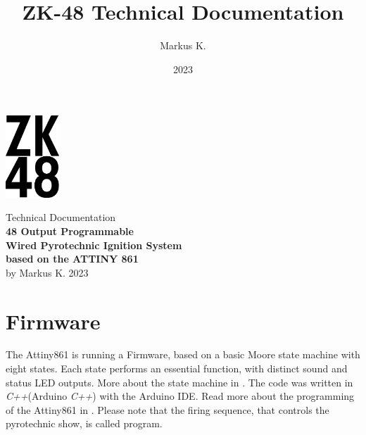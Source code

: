 

\title{ZK-48 Technical Documentation}
\author{Markus K.}
\date{2023}

%



\begin{titlepage}
\begin{center}
\vspace*{1cm}
\includegraphics[width=2cm]{./Figures/zk_48_logo.png}
\vspace*{1cm}

\Huge {Technical Documentation\\} 
\vspace*{1cm}
\Huge{\textbf{48 Output Programmable\\ Wired Pyrotechnic Ignition System\\ based on the ATTINY 861\\}}
\vspace*{0.5cm} 
\Large{by Markus K.}
\vspace*{0.5cm}
\Large{2023}

\end{center}
\end{titlepage}

\pagebreak 

\tableofcontents

\pagebreak



%



\section{Firmware}
\label{Firmware}
The Attiny861 is running a Firmware, based on a basic Moore state machine with eight states. Each state performs an essential function, with distinct sound and status LED outputs. More about the state machine in . The code was written in \textit{C++}(Arduino \textit{C++}) with the Arduino IDE. Read more about the programming of the Attiny861 in . Please note that the firing sequence, that controls the pyrotechnic show, is called program.


